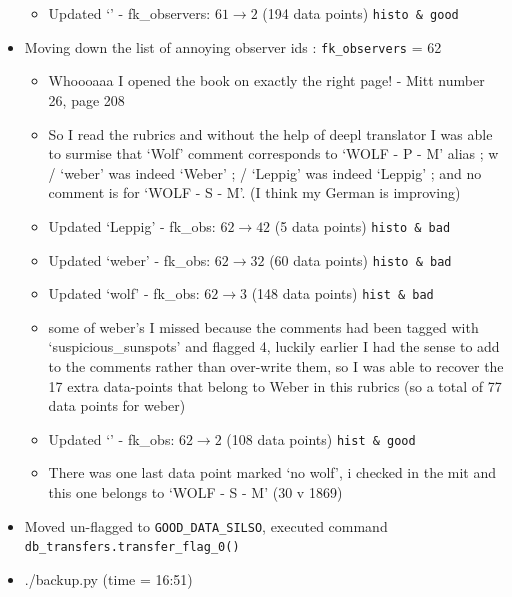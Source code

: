 \documentclass[12pt]{article}
\begin{document}
\begin{itemize}
\begin{itemize}
        \item Updated `' -  fk\_observers: $61\to 2$ (194 data points) \texttt{histo \& good}
    \end{itemize}
    \item Moving down the list of annoying observer ids : \texttt{fk\_observers} = 62
    \begin{itemize}
        \item Whoooaaa I opened the book on exactly the right page! - Mitt number 26, page 208
        \item So I read the rubrics and without the help of deepl translator I was able to surmise that `Wolf' comment corresponds to `WOLF - P - M' alias ; w / `weber' was indeed `Weber' ; \dag / `Leppig' was indeed `Leppig' ; and no comment is for `WOLF - S - M'. (I think my German is improving)
        \item Updated `Leppig' - fk\_obs: $62\to 42$ (5 data points) \texttt{histo \& bad}
        \item Updated `weber' - fk\_obs: $62\to 32$ (60 data points) \texttt{histo \& bad}
        \item Updated `wolf' - fk\_obs: $62\to 3$ (148 data points) \texttt{hist \& bad}
        \item some of weber's I missed because the comments had been tagged with `suspicious\_sunspots' and flagged 4, luckily earlier I had the sense to add to the comments rather than over-write them, so I was able to recover the 17 extra data-points that belong to Weber in this rubrics (so a total of 77 data points for weber)
        \item Updated `' - fk\_obs: $62\to 2$ (108 data points) \texttt{hist \& good}
        \item There was one last data point marked `no wolf', i checked in the mit and this one belongs to `WOLF - S - M' (30 v 1869) 
    \end{itemize}
    \item Moved un-flagged to \texttt{GOOD\_DATA\_SILSO}, executed command \texttt{db\_transfers.transfer\_flag\_0()}
    \item ./backup.py (time = 16:51)
\end{itemize}
\end{document}
